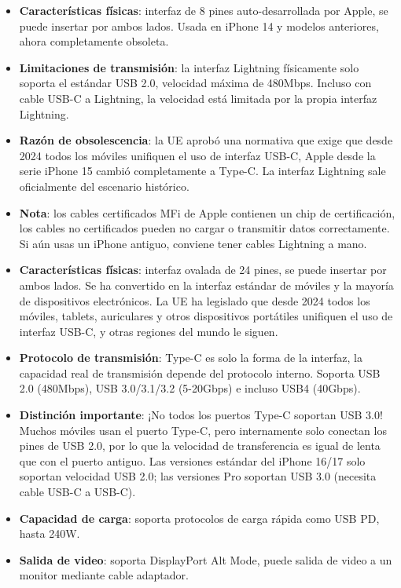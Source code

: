
\begin{itemize}
  \item \textbf{Características físicas}: interfaz de 8 pines auto-desarrollada por Apple, se puede insertar por ambos lados. Usada en iPhone 14 y modelos anteriores, ahora completamente obsoleta.
  \item \textbf{Limitaciones de transmisión}: la interfaz Lightning físicamente solo soporta el estándar USB 2.0, velocidad máxima de 480Mbps. Incluso con cable USB-C a Lightning, la velocidad está limitada por la propia interfaz Lightning.
  \item \textbf{Razón de obsolescencia}: la UE aprobó una normativa que exige que desde 2024 todos los móviles unifiquen el uso de interfaz USB-C, Apple desde la serie iPhone 15 cambió completamente a Type-C. La interfaz Lightning sale oficialmente del escenario histórico.
  \item \textbf{Nota}: los cables certificados MFi de Apple contienen un chip de certificación, los cables no certificados pueden no cargar o transmitir datos correctamente. Si aún usas un iPhone antiguo, conviene tener cables Lightning a mano.
\end{itemize}


\begin{itemize}
  \item \textbf{Características físicas}: interfaz ovalada de 24 pines, se puede insertar por ambos lados. Se ha convertido en la interfaz estándar de móviles y la mayoría de dispositivos electrónicos. La UE ha legislado que desde 2024 todos los móviles, tablets, auriculares y otros dispositivos portátiles unifiquen el uso de interfaz USB-C, y otras regiones del mundo le siguen.
  \item \textbf{Protocolo de transmisión}: Type-C es solo la forma de la interfaz, la capacidad real de transmisión depende del protocolo interno. Soporta USB 2.0 (480Mbps), USB 3.0/3.1/3.2 (5-20Gbps) e incluso USB4 (40Gbps).
  \item \textbf{Distinción importante}: ¡No todos los puertos Type-C soportan USB 3.0! Muchos móviles usan el puerto Type-C, pero internamente solo conectan los pines de USB 2.0, por lo que la velocidad de transferencia es igual de lenta que con el puerto antiguo. Las versiones estándar del iPhone 16/17 solo soportan velocidad USB 2.0; las versiones Pro soportan USB 3.0 (necesita cable USB-C a USB-C).
  \item \textbf{Capacidad de carga}: soporta protocolos de carga rápida como USB PD, hasta 240W.
  \item \textbf{Salida de video}: soporta DisplayPort Alt Mode, puede salida de video a un monitor mediante cable adaptador.
\end{itemize}

